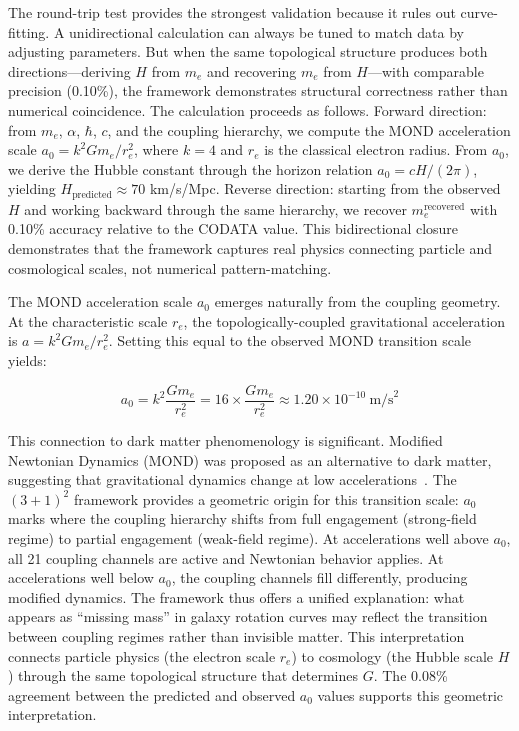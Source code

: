 The round-trip test provides the strongest validation because it rules out curve-fitting. A unidirectional calculation can always be tuned to match data by adjusting parameters. But when the same topological structure produces both directions---deriving $H$ from $m_e$ and recovering $m_e$ from $H$---with comparable precision (0.10\%), the framework demonstrates structural correctness rather than numerical coincidence. The calculation proceeds as follows. Forward direction: from $m_e$, $\alpha$, $\hbar$, $c$, and the coupling hierarchy, we compute the MOND acceleration scale $a_0 = k^2 G m_e / r_e^2$, where $k = 4$ and $r_e$ is the classical electron radius. From $a_0$, we derive the Hubble constant through the horizon relation $a_0 = cH/(2\pi)$, yielding $H_{\text{predicted}} \approx 70$ km/s/Mpc. Reverse direction: starting from the observed $H$ and working backward through the same hierarchy, we recover $m_e^{\text{recovered}}$ with 0.10\% accuracy relative to the CODATA value. This bidirectional closure demonstrates that the framework captures real physics connecting particle and cosmological scales, not numerical pattern-matching.

The MOND acceleration scale $a_0$ emerges naturally from the coupling geometry. At the characteristic scale $r_e$, the topologically-coupled gravitational acceleration is $a = k^2 G m_e / r_e^2$. Setting this equal to the observed MOND transition scale yields:

\begin{equation}
a_0 = k^2 \frac{G m_e}{r_e^2} = 16 \times \frac{G m_e}{r_e^2} \approx 1.20 \times 10^{-10}~\text{m/s}^2
\label{eq:a0}
\end{equation}

This connection to dark matter phenomenology is significant. Modified Newtonian Dynamics (MOND) was proposed as an alternative to dark matter, suggesting that gravitational dynamics change at low accelerations~\cite{milgrom1983}. The $(3+1)^2$ framework provides a geometric origin for this transition scale: $a_0$ marks where the coupling hierarchy shifts from full engagement (strong-field regime) to partial engagement (weak-field regime). At accelerations well above $a_0$, all 21 coupling channels are active and Newtonian behavior applies. At accelerations well below $a_0$, the coupling channels fill differently, producing modified dynamics. The framework thus offers a unified explanation: what appears as ``missing mass'' in galaxy rotation curves may reflect the transition between coupling regimes rather than invisible matter. This interpretation connects particle physics (the electron scale $r_e$) to cosmology (the Hubble scale $H$) through the same topological structure that determines $G$. The 0.08\% agreement between the predicted and observed $a_0$ values supports this geometric interpretation.

